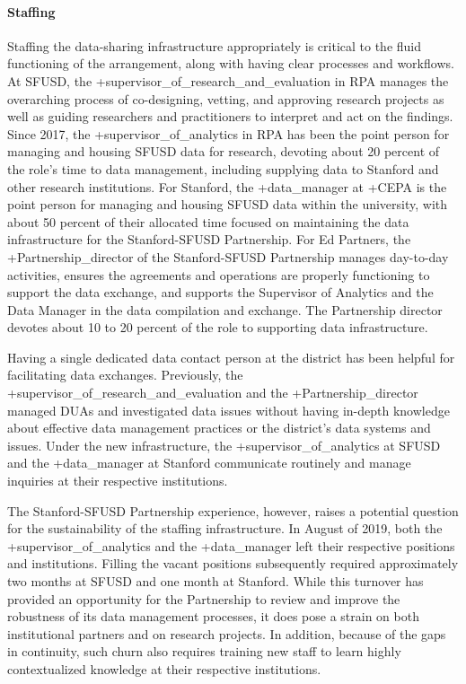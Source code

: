 \documentclass[
]{WileySix}
\begin{document}
\hypertarget{staffing}{%
\paragraph{Staffing}\label{staffing}}

Staffing the data-sharing infrastructure appropriately is critical to the fluid functioning of the arrangement, along with having clear processes and workflows. At SFUSD, the +supervisor\_of\_research\_and\_evaluation\textbar{} in RPA manages the overarching process of co-designing, vetting, and approving research projects as well as guiding researchers and practitioners to interpret and act on the findings. Since 2017, the +supervisor\_of\_analytics\textbar{} in RPA has been the point person for managing and housing SFUSD data for research, devoting about 20 percent of the role's time to data management, including supplying data to Stanford and other research institutions. For Stanford, the +data\_manager\textbar{} at +CEPA\textbar{} is the point person for managing and housing SFUSD data within the university, with about 50 percent of their allocated time focused on maintaining the data infrastructure for the Stanford-SFUSD Partnership. For Ed Partners, the +Partnership\_director\textbar{} of the Stanford-SFUSD Partnership manages day-to-day activities, ensures the agreements and operations are properly functioning to support the data exchange, and supports the Supervisor of Analytics and the Data Manager in the data compilation and exchange. The Partnership director devotes about 10 to 20 percent of the role to supporting data infrastructure.

Having a single dedicated data contact person at the district has been helpful for facilitating data exchanges. Previously, the +supervisor\_of\_research\_and\_evaluation\textbar{} and the +Partnership\_director\textbar{} managed DUAs and investigated data issues without having in-depth knowledge about effective data management practices or the district's data systems and issues. Under the new infrastructure, the +supervisor\_of\_analytics\textbar{} at SFUSD and the +data\_manager\textbar{} at Stanford communicate routinely and manage inquiries at their respective institutions.

The Stanford-SFUSD Partnership experience, however, raises a potential question for the sustainability of the staffing infrastructure. In August of 2019, both the +supervisor\_of\_analytics\textbar{} and the +data\_manager\textbar{} left their respective positions and institutions. Filling the vacant positions subsequently required approximately two months at SFUSD and one month at Stanford. While this turnover has provided an opportunity for the Partnership to review and improve the robustness of its data management processes, it does pose a strain on both institutional partners and on research projects. In addition, because of the gaps in continuity, such churn also requires training new staff to learn highly contextualized knowledge at their respective institutions.
\end{document}
